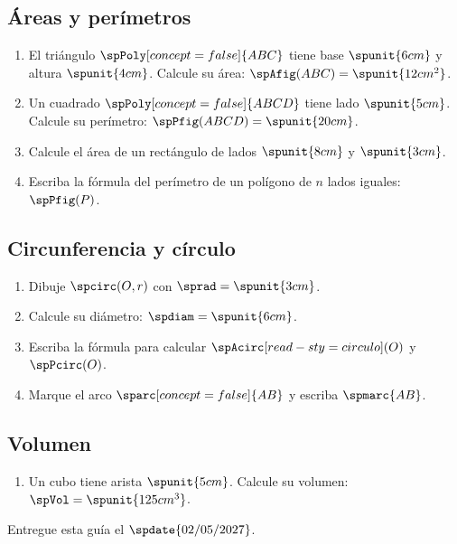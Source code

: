 \documentclass{article}
\begin{document}
\subsection*{Áreas y perímetros}

\begin{enumerate}
  \item El triángulo $\spPoly[concept=false]{ABC}$ tiene base $\spunit{6 cm}$ y altura $\spunit{4 cm}$. Calcule su área: $\spAfig(ABC) = \spunit{12 cm^{2}}$.
  \item Un cuadrado $\spPoly[concept=false]{ABCD}$ tiene lado $\spunit{5 cm}$. Calcule su perímetro: $\spPfig(ABCD) = \spunit{20 cm}$.
  \item Calcule el área de un rectángulo de lados $\spunit{8 cm}$ y $\spunit{3 cm}$.
  \item Escriba la fórmula del perímetro de un polígono de $n$ lados iguales: $\spPfig(P)$.
\end{enumerate}

\subsection*{Circunferencia y círculo}

\begin{enumerate}
  \item Dibuje $\spcirc(O, r)$ con $\sprad = \spunit{3 cm}$.
  \item Calcule su diámetro: $\spdiam = \spunit{6 cm}$.
  \item Escriba la fórmula para calcular $\spAcirc[read-sty=circulo](O)$ y $\spPcirc(O)$.
  \item Marque el arco $\sparc[concept=false]{AB}$ y escriba $\spmarc{AB}$.
\end{enumerate}

\subsection*{Volumen}

\begin{enumerate}
  \item Un cubo tiene arista $\spunit{5 cm}$. Calcule su volumen: $\spVol = \spunit{125 cm^{3}}$.
\end{enumerate}

Entregue esta guía el $\spdate{02/05/2027}$.
\end{document}
